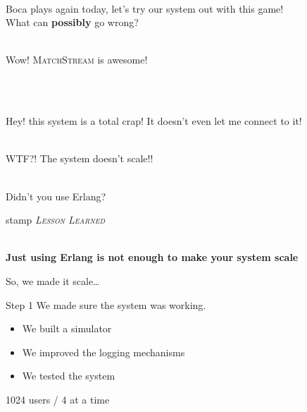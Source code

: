 \documentclass[utf8]{beamer}
\begin{document}
\begin{frame}
	\begin{description}
		\item<+->[Brujo]\ \\ Boca plays again today, let's try our system out with this game!\\ What can \textbf{possibly} go wrong?
		\item<+->[User 1]\ \\ Wow! \textsc{MatchStream} is awesome!
		\item<+->[\ldots]\ 
		\item<+->[User 100]\ \\ Hey! this system is a total crap! It doesn't even let me connect to it!
		\item<+->[Brujo]\ \\ WTF?! \alert{The system doesn't scale}!!
		\item<+->[A Friend]\ \\ Didn't you use \alert{Erlang}?
	\end{description}
\end{frame}

\begin{frame}
	\begin{beamercolorbox}[wd=1\textwidth,shadow=true,rounded=true]{stamp}
		\emph{\textsc{Lesson Learned}}
	\end{beamercolorbox}
	\ \\
	\textbf{Just using Erlang is not enough to make your system scale}
\end{frame}

\begin{frame}
	\begin{center}
		{\Large
			\textsf{So, we made it scale\ldots}}
	\end{center}
\end{frame}

\begin{frame}{Step 1}
We made sure the system was working.
\pause
\begin{itemize}
	\item<+-> We built a simulator
	\item<+-> We improved the logging mechanisms
	\item<+-> We tested the system
\end{itemize}
\end{frame}

\begin{frame}
1024 users / 4 at a time
\end{frame}
\end{document}
